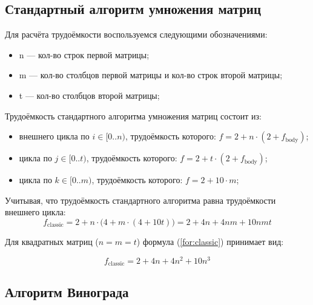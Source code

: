 \subsection{Стандартный алгоритм умножения матриц}

Для расчёта трудоёмкости воспользуемся следующими обозначениями:

\begin{itemize}
	\item[---] n --- кол-во строк первой матрицы;
	\item[---] m --- кол-во столбцов первой матрицы и кол-во строк второй матрицы;
	\item[---] t --- кол-во столбцов второй матрицы;
\end{itemize}

Трудоёмкость стандартного алгоритма умножения матриц состоит из:

\begin{itemize}
	\item[---] внешнего цикла по $i \in [0..n)$, трудоёмкость которого: $f = 2 + n \cdot (2 + f_{\text{body}})$;
	\item[---] цикла по $j \in [0..t)$, трудоёмкость которого: $f = 2 + t \cdot (2 + f_{\text{body}})$;
	\item[---] цикла по $k \in [0..m)$, трудоёмкость которого: $f = 2 + 10 \cdot m$;
\end{itemize}

Учитывая, что трудоёмкость стандартного алгоритма равна трудоёмкости внешнего цикла:
\begin{equation}
	\label{for:classic}
	f_{\text{classic}} = 2 + n \cdot \bigl(4 + m \cdot (4 + 10t)\bigr) = 2 + 4n + 4nm + 10nmt 
\end{equation}

Для квадратных матриц (\( n = m = t \)) формула (\ref{for:classic}) принимает вид:

\begin{equation}
	\label{for:classic_square}
	f_{\text{classic}} = 2 + 4n + 4n^2 + 10n^3
\end{equation}

\subsection{Алгоритм Винограда}

